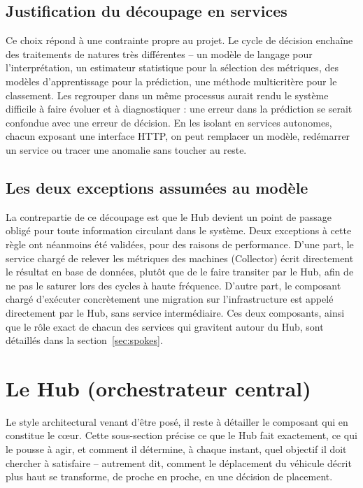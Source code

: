 \subsection{Justification du découpage en services}
Ce choix répond à une contrainte propre au projet. Le cycle de décision enchaîne des traitements de natures très différentes -- un modèle de langage pour l'interprétation, un estimateur statistique pour la sélection des métriques, des modèles d'apprentissage pour la prédiction, une méthode multicritère pour le classement. Les regrouper dans un même processus aurait rendu le système difficile à faire évoluer et à diagnostiquer : une erreur dans la prédiction se serait confondue avec une erreur de décision. En les isolant en services autonomes, chacun exposant une interface HTTP, on peut remplacer un modèle, redémarrer un service ou tracer une anomalie sans toucher au reste.

\subsection{Les deux exceptions assumées au modèle}
La contrepartie de ce découpage est que le Hub devient un point de passage obligé pour toute information circulant dans le système. Deux exceptions à cette règle ont néanmoins été validées, pour des raisons de performance. D'une part, le service chargé de relever les métriques des machines (Collector) écrit directement le résultat en base de données, plutôt que de le faire transiter par le Hub, afin de ne pas le saturer lors des cycles à haute fréquence. D'autre part, le composant chargé d'exécuter concrètement une migration sur l'infrastructure est appelé directement par le Hub, sans service intermédiaire. Ces deux composants, ainsi que le rôle exact de chacun des services qui gravitent autour du Hub, sont détaillés dans la section~\ref{sec:spokes}.

\section{Le Hub (orchestrateur central)}
\label{sec:hub}

Le style architectural venant d'être posé, il reste à détailler le composant qui en constitue le cœur. Cette sous-section précise ce que le Hub fait exactement, ce qui le pousse à agir, et comment il détermine, à chaque instant, quel objectif il doit chercher à satisfaire -- autrement dit, comment le déplacement du véhicule décrit plus haut se transforme, de proche en proche, en une décision de placement.

